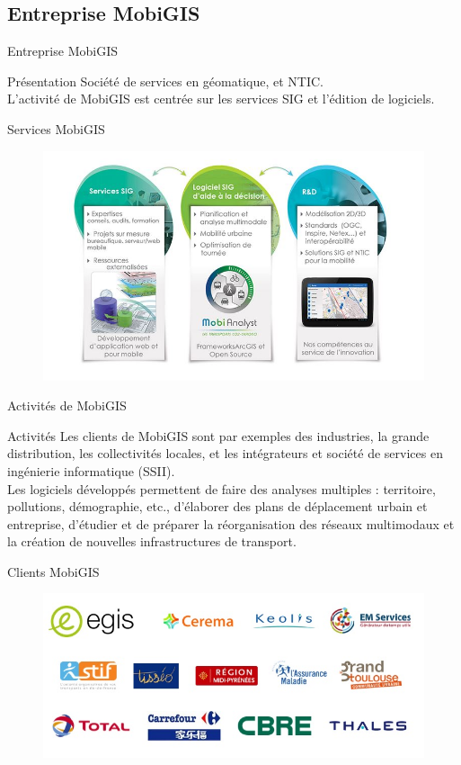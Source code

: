 \documentclass[utf8,compress]{beamer}
\begin{document}
\subsection{Entreprise MobiGIS}
\begin{frame}{Entreprise MobiGIS}
\begin{block}{Présentation}
Société de services en géomatique, et NTIC.\\	
L’activité de MobiGIS est centrée sur les services SIG et l’édition de logiciels. \\
\end{block}
\end{frame}
\begin{frame}{Services MobiGIS}
\begin{figure}[h]
    \center
    \includegraphics[width=\textwidth]{images/fig1_solutionsMobigis.JPG}
\end{figure}
\end{frame}
\begin{frame}{Activités de MobiGIS}
\begin{block}{Activités}
Les clients de MobiGIS sont par exemples des industries, la grande distribution, les collectivités locales, et
les intégrateurs et société de services en ingénierie informatique (SSII). \\
Les logiciels développés permettent de faire des analyses multiples : territoire, pollutions, démographie, etc., d'élaborer des plans de déplacement urbain et entreprise, d'étudier et de préparer la réorganisation des réseaux multimodaux et la création de nouvelles infrastructures de transport.
\end{block}
\end{frame}
\begin{frame}{Clients MobiGIS}
\begin{figure}[h]
    \center
    \includegraphics[width=\textwidth]{images/fig2_referencesMobigis.JPG}
\end{figure}
\end{frame}
\end{document}
